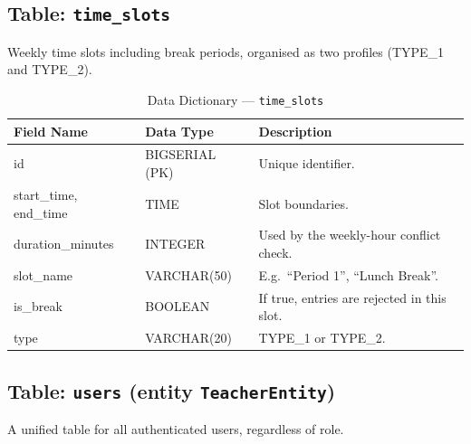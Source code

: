 \subsection{Table: \texttt{time\_slots}}
Weekly time slots including break periods, organised as two profiles (TYPE\_1 and TYPE\_2).

\begin{table}[H]
    \centering
    \renewcommand{\arraystretch}{1.5}
    \begin{tabular}{|p{3cm}|p{3cm}|p{7.5cm}|}
        \hline
        \textbf{Field Name} & \textbf{Data Type} & \textbf{Description} \\
        \hline
        id & BIGSERIAL (PK) & Unique identifier. \\
        \hline
        start\_time, end\_time & TIME & Slot boundaries. \\
        \hline
        duration\_minutes & INTEGER & Used by the weekly-hour conflict check. \\
        \hline
        slot\_name & VARCHAR(50) & E.g.\ ``Period 1'', ``Lunch Break''. \\
        \hline
        is\_break & BOOLEAN & If true, entries are rejected in this slot. \\
        \hline
        type & VARCHAR(20) & TYPE\_1 or TYPE\_2. \\
        \hline
    \end{tabular}
    \caption{Data Dictionary --- \texttt{time\_slots}}
    \label{tab:dd_time_slots}
\end{table}

\subsection{Table: \texttt{users} (entity \texttt{TeacherEntity})}
A unified table for all authenticated users, regardless of role.

